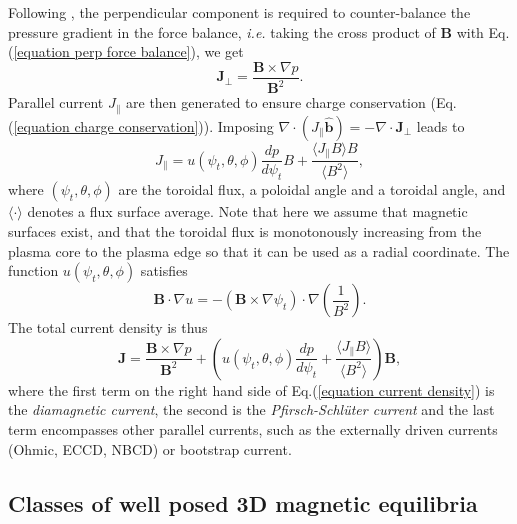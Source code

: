\documentclass[my_thesis.tex]{subfiles}
\begin{document}
Following \citet{Helander2014}, the perpendicular component is required to counter-balance the pressure gradient in the force balance, \textit{i.e.} taking the cross product of $\mathbf{B}$ with Eq.(\ref{equation perp force balance}), we get
\begin{equation}
	\mathbf{J}_\perp = \frac{\mathbf{B}\times\nabla p}{\mathbf{B}^2}.
\end{equation}
Parallel current $J_\parallel$ are then generated to ensure charge conservation (Eq.(\ref{equation charge conservation})). Imposing $\nabla \cdot (J_\parallel\mathbf{\hat{b}}) = - \nabla\cdot\mathbf{J}_\perp$ leads to 
\begin{equation}
	J_\parallel = u(\psi_t,\theta,\phi)\frac{dp}{d\psi_t}B + \frac{\langle J_\parallel B\rangle B}{\langle B^2\rangle},
\end{equation}
where $(\psi_t,\theta,\phi)$ are the toroidal flux, a poloidal angle and a toroidal angle, and $\langle\cdot\rangle$ denotes a flux surface average. Note that here we assume that magnetic surfaces exist, and that the toroidal flux is monotonously increasing from the plasma core to the plasma edge so that it can be used as a radial coordinate. The function $u(\psi_t,\theta,\phi)$ satisfies
\begin{equation}
	\mathbf{B}\cdot\nabla u = -(\mathbf{B}\times\nabla\psi_t)\cdot\nabla\left(\frac{1}{B^2}\right). \label{eq.diff_u}
\end{equation}
The total current density is thus
\begin{equation}
	\mathbf{J} = \frac{\mathbf{B}\times\nabla p}{\mathbf{B}^2} + \left(u(\psi_t,\theta,\phi)\frac{dp}{d\psi_t} + \frac{\langle J_\parallel B\rangle}{\langle B^2\rangle}\right)\mathbf{B}, \label{equation current density}
\end{equation}
where the first term on the right hand side of Eq.(\ref{equation current density}) is the \emph{diamagnetic current}, the second is the \emph{Pfirsch-Schl\"uter current} and the last term encompasses other parallel currents, such as the externally driven currents (Ohmic, \ac{ECCD}, \ac{NBCD}) or bootstrap current.




\subsection{Classes of well posed 3D magnetic equilibria}\label{sec. diverging currents}
\end{document}
